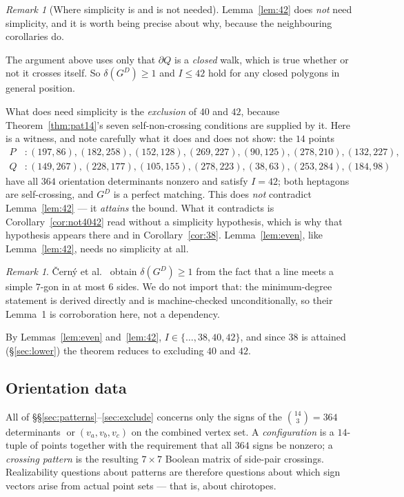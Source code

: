 \documentclass[11pt,a4paper]{article}
\theoremstyle{plain}
\theoremstyle{definition}
\theoremstyle{remark}
\newtheorem{remark}[theorem]{Remark}
\newcommand{\GD}{G^{D}}
\newcommand{\orient}{\operatorname{or}}
\begin{document}
\begin{remark}[Where simplicity is and is not needed]
Lemma~\ref{lem:42} does \emph{not} need simplicity, and it is worth being
precise about why, because the neighbouring corollaries do.

The argument above uses only that $\partial Q$ is a \emph{closed} walk, which is
true whether or not it crosses itself. So $\delta(\GD)\ge1$ and $I\le 42$ hold for
any closed polygons in general position.

What does need simplicity is the \emph{exclusion} of $40$ and $42$, because
Theorem~\ref{thm:pat14}'s seven self-non-crossing conditions are supplied by it.
Here is a witness, and note carefully what it does and does not show: the
$14$ points
\[
\begin{aligned}
P&:(197,86),(182,258),(152,128),(269,227),(90,125),(278,210),(132,227),\\
Q&:(149,267),(228,177),(105,155),(278,223),(38,63),(253,284),(184,98)
\end{aligned}
\]
have all $364$ orientation determinants nonzero and satisfy $I=42$; both
heptagons are self-crossing, and $\GD$ is a perfect matching. This does
\emph{not} contradict Lemma~\ref{lem:42} --- it \emph{attains} the bound. What it
contradicts is Corollary~\ref{cor:not4042} read without a simplicity hypothesis,
which is why that hypothesis appears there and in Corollary~\ref{cor:38}.
Lemma~\ref{lem:even}, like Lemma~\ref{lem:42}, needs no simplicity at all.
\end{remark}

\begin{remark}
\v{C}ern\'y et al.~\cite[Lemma~1]{CernyEtAl2003} obtain $\delta(\GD)\ge1$ from the fact that a
line meets a simple $7$-gon in at most $6$ sides. We do not import that: the
minimum-degree statement is derived directly and is machine-checked
unconditionally, so their Lemma~1 is corroboration here, not a dependency.
\end{remark}

By Lemmas~\ref{lem:even} and~\ref{lem:42}, $I\in\{\dots,38,40,42\}$, and since
$38$ is attained (\S\ref{sec:lower}) the theorem reduces to excluding $40$ and
$42$.

\subsection{Orientation data}

All of \S\S\ref{sec:patterns}--\ref{sec:exclude} concerns only the signs of the
$\binom{14}{3}=364$ determinants $\orient(v_a,v_b,v_c)$ on the combined vertex
set. A \emph{configuration} is a $14$-tuple of points together with the
requirement that all $364$ signs be nonzero; a \emph{crossing pattern} is the
resulting $7\times7$ Boolean matrix of side-pair crossings. Realizability
questions about patterns are therefore questions about which sign vectors arise
from actual point sets --- that is, about chirotopes.
\end{document}
